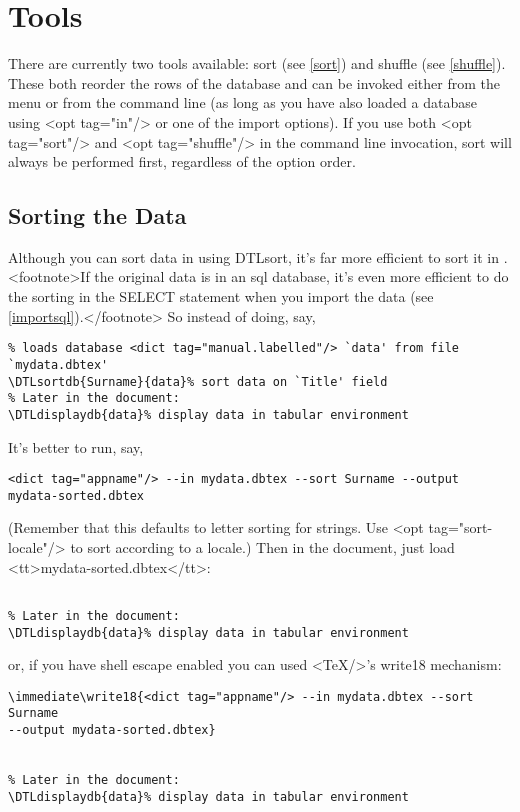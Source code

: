 \chapter{Tools}\label{tools}

   There are currently two tools available: sort (see \autoref{sort})
   and shuffle (see \autoref{shuffle}). These both reorder the rows of the
   database and can be invoked either from the  menu
   or from the command line (as long as
   you have also loaded a database using <opt tag="in"/> or one of the
   import options). If you use both <opt tag="sort"/> and <opt tag="shuffle"/>
   in the command line invocation, sort will always be performed first, 
   regardless of the option order.


\section{Sorting the Data}\label{sort}

   Although you can sort data in  using \gls{DTLsort}, 
   it's far more efficient to sort it in .<footnote>If the original 
   data is in an \gls{sql} database, it's even more efficient to 
   do the sorting in the SELECT statement when you import the data (see 
   \autoref{importsql}).</footnote> So instead of doing, say,
\begin{verbatim}
% loads database <dict tag="manual.labelled"/> `data' from file `mydata.dbtex'
\DTLsortdb{Surname}{data}% sort data on `Title' field
% Later in the document:
\DTLdisplaydb{data}% display data in tabular environment
\end{verbatim}
It's better to run, say,
\begin{verbatim}
<dict tag="appname"/> --in mydata.dbtex --sort Surname --output mydata-sorted.dbtex
\end{verbatim}
(Remember that this defaults to letter sorting for strings. Use
<opt tag="sort-locale"/> to sort according to a locale.)
Then in the document, just load <tt>mydata-sorted.dbtex</tt>:
\begin{verbatim}

% Later in the document:
\DTLdisplaydb{data}% display data in tabular environment
\end{verbatim}
   or, if you have shell escape enabled you can used <TeX/>'s 
\gls{write18} mechanism:

\begin{verbatim}
\immediate\write18{<dict tag="appname"/> --in mydata.dbtex --sort Surname 
--output mydata-sorted.dbtex}


% Later in the document:
\DTLdisplaydb{data}% display data in tabular environment
\end{verbatim}


